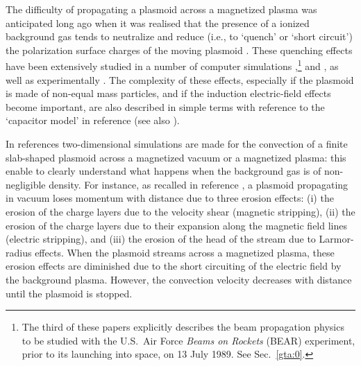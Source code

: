 \documentclass [12pt,a4paper,     ]{report} %
\begin{document}
The difficulty of propagating a plasmoid across a magnetized plasma was anticipated long ago when it was realised that the presence of a ionized background gas tends to neutralize and reduce (i.e., to `quench' or `short circuit') the polarization surface charges of the moving plasmoid \cite[p.921]{CHAPM1960-}.  These quenching effects have been extensively studied in a number of computer simulations \cite{WINGL1987A, WINGL1987B, WINGL1987C},\footnote{The third of these papers explicitly describes the beam propagation physics to be studied with the U.S.\ Air Force \emph{Beams on Rockets} (BEAR) experiment, prior to its launching into space, on 13 July 1989. See Sec.~\ref{gta:0}.} and \cite{LIVES1989-, GALVE1989B, GALVE1990-}, as well as experimentally \cite{HONG-1988-, WESSE1988-}.  The complexity of these effects, especially if the plasmoid is made of non-equal mass particles, and if the induction electric-field effects become important, are also described in simple terms with reference to the `capacitor model' in reference \cite[Sec.III]{BOROV1987-} (see also \cite[p.1896]{GALVE1991-}).


   In references \cite{LIVES1989-, GALVE1989B, GALVE1990-} two-dimensional simulations are made for the convection of a finite slab-shaped plasmoid across a magnetized vacuum or a magnetized plasma: this enable to clearly understand what happens when the background gas is of non-negligible density.  For instance, as recalled in reference \cite{GALVE1989B}, a plasmoid propagating in vacuum loses momentum with distance due to three erosion effects: (i) the erosion of the charge layers due to the velocity shear (magnetic stripping), (ii) the erosion of the charge layers due to their expansion along the magnetic field lines (electric stripping), and (iii) the erosion of the head of the stream due to Larmor-radius effects.  When the plasmoid streams across a magnetized plasma, these erosion effects are diminished due to the short circuiting of the electric field by the background plasma.  However, the convection velocity decreases with distance until the plasmoid is stopped.

\end{document}
